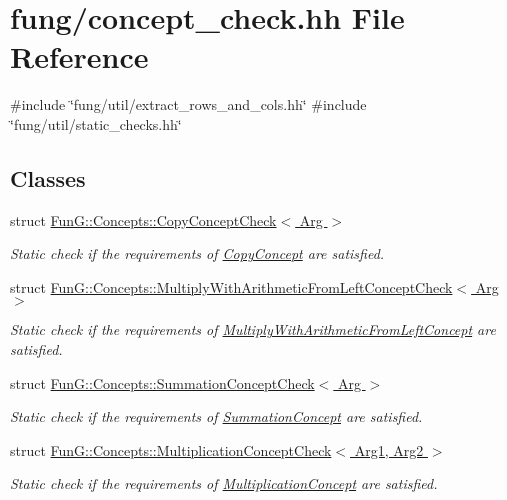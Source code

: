 \hypertarget{concept__check_8hh}{\section{fung/concept\-\_\-check.hh \-File \-Reference}
\label{concept__check_8hh}
}
{\ttfamily \#include \char`\"{}fung/util/extract\-\_\-rows\-\_\-and\-\_\-cols.\-hh\char`\"{}}\*
{\ttfamily \#include \char`\"{}fung/util/static\-\_\-checks.\-hh\char`\"{}}\*
\subsection*{\-Classes}
\begin{DoxyCompactItemize}
\item 
struct \hyperlink{structFunG_1_1Concepts_1_1CopyConceptCheck}{\-Fun\-G\-::\-Concepts\-::\-Copy\-Concept\-Check$<$ Arg $>$}
\begin{DoxyCompactList}\small\item\em \-Static check if the requirements of \hyperlink{structFunG_1_1Concepts_1_1CopyConcept}{\-Copy\-Concept} are satisfied. \end{DoxyCompactList}\item 
struct \hyperlink{structFunG_1_1Concepts_1_1MultiplyWithArithmeticFromLeftConceptCheck}{\-Fun\-G\-::\-Concepts\-::\-Multiply\-With\-Arithmetic\-From\-Left\-Concept\-Check$<$ Arg $>$}
\begin{DoxyCompactList}\small\item\em \-Static check if the requirements of \hyperlink{structFunG_1_1Concepts_1_1MultiplyWithArithmeticFromLeftConcept}{\-Multiply\-With\-Arithmetic\-From\-Left\-Concept} are satisfied. \end{DoxyCompactList}\item 
struct \hyperlink{structFunG_1_1Concepts_1_1SummationConceptCheck}{\-Fun\-G\-::\-Concepts\-::\-Summation\-Concept\-Check$<$ Arg $>$}
\begin{DoxyCompactList}\small\item\em \-Static check if the requirements of \hyperlink{structFunG_1_1Concepts_1_1SummationConcept}{\-Summation\-Concept} are satisfied. \end{DoxyCompactList}\item 
struct \hyperlink{structFunG_1_1Concepts_1_1MultiplicationConceptCheck}{\-Fun\-G\-::\-Concepts\-::\-Multiplication\-Concept\-Check$<$ Arg1, Arg2 $>$}
\begin{DoxyCompactList}\small\item\em \-Static check if the requirements of \hyperlink{structFunG_1_1Concepts_1_1MultiplicationConcept}{\-Multiplication\-Concept} are satisfied. \end{DoxyCompactList}\item 

\end{DoxyCompactItemize}
